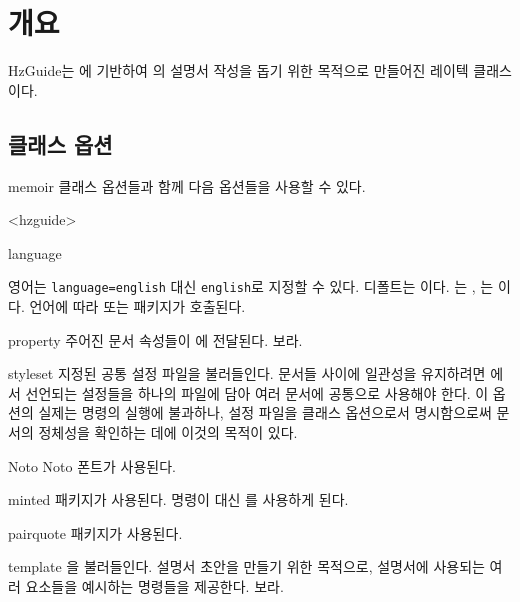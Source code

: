 \documentclass[pairquote, minted]{hzguide}
\begin{document}
\mainmatter*

\chapter{개요}

HzGuide는 에 기반하여 의 설명서 작성을 돕기 위한 목적으로 만들어진 레이텍 클래스이다.

\section{클래스 옵션}

memoir 클래스 옵션들과 함께 다음 옵션들을 사용할 수 있다.


\begin{macros}<hzguide>
\item[language] 

영어는 \texttt{language=english} 대신 \texttt{english}로 지정할 수 있다.
디폴트는 이다. 
는 , 는 이다.
언어에 따라  또는  패키지가 호출된다.

\item[property] 
주어진 문서 속성들이 \macro{\DocumentSetup}에 전달된다.
\를 보라.

\item[styleset] 
지정된 공통 설정 파일을 불러들인다.
문서들 사이에 일관성을 유지하려면 에서 선언되는 설정들을 하나의 파일에 담아 여러 문서에 공통으로 사용해야 한다.
이 옵션의 실제는 \macro{} 명령의 실행에 불과하나, 설정 파일을 클래스 옵션으로서 명시함으로써 문서의 정체성을 확인하는 데에 이것의 목적이 있다.

\item[Noto] \keyvalueTF
Noto 폰트가 사용된다.

\item[minted] \keyvalueTF
{} 패키지가 사용된다. \macro{\coderead} 명령이 \macro{} 대신 를 사용하게 된다.

\item[pairquote] \keyvalueTF
{} 패키지가 사용된다.

\item[template] \keyvalueTF
{}을 불러들인다. 설명서 초안을 만들기 위한 목적으로, 설명서에 사용되는 여러 요소들을 예시하는 명령들을 제공한다.
\을 보라.
\end{macros}
\end{document}
